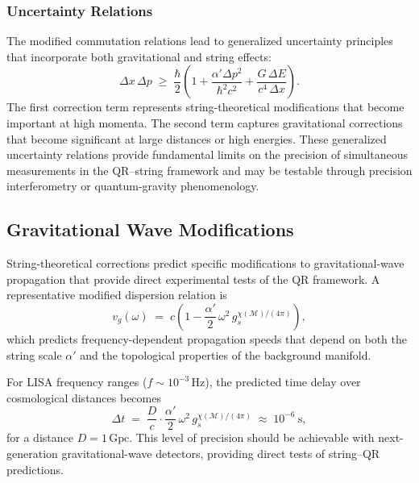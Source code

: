 \subsubsection{Uncertainty Relations}
\label{subsubsec:uncertainty-relations}

The modified commutation relations lead to generalized uncertainty principles that incorporate both gravitational and string effects:
\begin{equation}
\Delta x\, \Delta p \;\ge\; \frac{\hbar}{2}\left(1 + \frac{\alpha' \Delta p^2}{\hbar^2 c^2} + \frac{G\, \Delta E}{c^4\, \Delta x}\right).
\label{eq:generalized-uncertainty}
\end{equation}
The first correction term represents string-theoretical modifications that become important at high momenta. The second term captures gravitational corrections that become significant at large distances or high energies. These generalized uncertainty relations provide fundamental limits on the precision of simultaneous measurements in the QR--string framework and may be testable through precision interferometry or quantum-gravity phenomenology.

\subsection{Gravitational Wave Modifications}
\label{subsec:gravitational-waves}

String-theoretical corrections predict specific modifications to gravitational-wave propagation that provide direct experimental tests of the QR framework. A representative modified dispersion relation is
\begin{equation}
v_g(\omega) \;=\; c\!\left(1 - \frac{\alpha'}{2}\,\omega^2\, g_s^{\chi(\mathcal{M})/(4\pi)}\right),
\label{eq:gw-dispersion}
\end{equation}
which predicts frequency-dependent propagation speeds that depend on both the string scale $\alpha'$ and the topological properties of the background manifold.

For LISA frequency ranges ($f \sim 10^{-3}\,\text{Hz}$), the predicted time delay over cosmological distances becomes
\begin{equation}
\Delta t \;=\; \frac{D}{c}\cdot \frac{\alpha'}{2}\,\omega^2\, g_s^{\chi(\mathcal{M})/(4\pi)} \;\approx\; 10^{-6}\ \text{s},
\label{eq:gw-time-delay}
\end{equation}
for a distance $D = 1\,\text{Gpc}$. This level of precision should be achievable with next-generation gravitational-wave detectors, providing direct tests of string–QR predictions.

